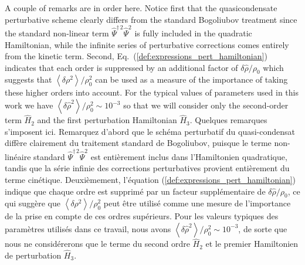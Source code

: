 \documentclass[aps,prd,notitlepage,amsfonts,amssymb,amsmath,nofootinbib,superscriptaddress,longbibliography]{revtex4-2}
\newcommand{\trad}[1]{\textcolor{tradcolor}{#1}}
\begin{document}
A couple of remarks are in order here. Notice first that the quasicondensate perturbative scheme clearly differs from the standard Bogoliubov treatment since the standard non-linear term $\hat{\Psi}^{\dagger \,  2} \hat{\Psi}^2$ is fully included in the quadratic Hamiltonian, while the infinite series of perturbative corrections comes entirely from the kinetic term.  
Second, Eq.~(\ref{def:expressions_pert_hamiltonian}) indicates that each order is suppressed by an additional factor of $\delta\hat{\rho}/\rho_{0}$ which suggests that $\left\langle \delta\rho^{2} \right\rangle/\rho_{0}^{2}$ can be used as a measure of the importance of taking these higher orders into account. For the typical values of parameters used in this work we have $\left\langle \delta\hat{\rho}^{2}\right\rangle / \rho_{0}^{2} \sim 10^{-3}$ so that we will consider only the second-order term $\hat{H}_{2}$ and the first perturbation Hamiltonian $\hat{H}_{3}$.
\trad{
Quelques remarques s'imposent ici. Remarquez d'abord que le schéma perturbatif du quasi-condensat diffère clairement du traitement standard de Bogoliubov, puisque le terme non-linéaire standard $\hat{\Psi}^{\dagger \,  2} \hat{\Psi}^2$ est entièrement inclus dans l'Hamiltonien quadratique, tandis que la série infinie des corrections perturbatives provient entièrement du terme cinétique. 
Deuxièmement, l'équation (\ref{def:expressions_pert_hamiltonian}) indique que chaque ordre est supprimé par un facteur supplémentaire de $\delta\hat{\rho}/\rho_{0}$, ce qui suggère que $\left\langle \delta\rho^{2} \right\rangle/\rho_{0}^{2}$ peut être utilisé comme une mesure de l'importance de la prise en compte de ces ordres supérieurs. Pour les valeurs typiques des paramètres utilisés dans ce travail, nous avons $\left\langle \delta\hat{\rho}^{2}\right\rangle / \rho_{0}^{2} \sim 10^{-3}$, de sorte que nous ne considérerons que le terme du second ordre $\hat{H}_{2}$ et le premier Hamiltonien de perturbation $\hat{H}_{3}$.\\
}
\end{document}
